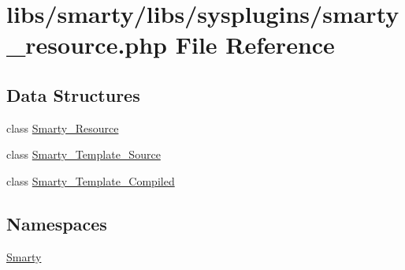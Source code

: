 \hypertarget{smarty__resource_8php}{}\section{libs/smarty/libs/sysplugins/smarty\+\_\+resource.php File Reference}
\label{smarty__resource_8php}
\subsection*{Data Structures}
\begin{DoxyCompactItemize}
\item 
class \hyperlink{class_smarty___resource}{Smarty\+\_\+\+Resource}
\item 
class \hyperlink{class_smarty___template___source}{Smarty\+\_\+\+Template\+\_\+\+Source}
\item 
class \hyperlink{class_smarty___template___compiled}{Smarty\+\_\+\+Template\+\_\+\+Compiled}
\end{DoxyCompactItemize}
\subsection*{Namespaces}
\begin{DoxyCompactItemize}
\item 
 \hyperlink{namespace_smarty}{Smarty}
\end{DoxyCompactItemize}
